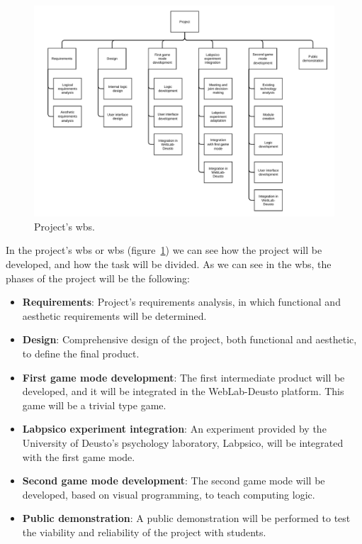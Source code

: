 \begin{figure}
	\centering
	\includegraphics[height=0.9\textwidth, angle=90]{fig/wbs}
	\caption{Project's \acrlong{wbs}.}\label{fig:wbs}
\end{figure}

In the project's \acrlong{wbs} or \acrshort{wbs} (figure~\ref{fig:wbs}) we can see how the project
will be developed, and how the task will be divided. As we can see in the \acrshort{wbs}, the phases
of the project will be the following:

\begin{itemize}
\item \textbf{Requirements}: Project's requirements analysis, in which functional and aesthetic
requirements will be determined.

\item \textbf{Design}: Comprehensive design of the project, both functional and aesthetic, to define
the final product.

\item \textbf{First game mode development}: The first intermediate product will be developed, and it
will be integrated in the WebLab-Deusto platform. This game will be a trivial type game.

\item \textbf{Labpsico experiment integration}: An experiment provided by the University of Deusto's
psychology laboratory, Labpsico, will be integrated with the first game mode.

\item \textbf{Second game mode development}: The second game mode will be developed, based on visual
programming, to teach computing logic.

\item \textbf{Public demonstration}: A public demonstration will be performed to test the viability
and reliability of the project with students.
\end{itemize}

